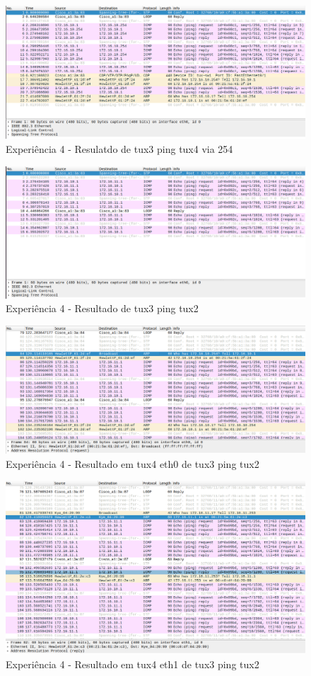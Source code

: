 \begin{figure}[H]
\centering
  \includegraphics[width=\linewidth]{img/EXP4-3to4-254.png}
  \caption{Experiência 4 - Resulatdo de tux3 ping tux4 via 254}
\end{figure}

\begin{figure}[H]
\centering
  \includegraphics[width=\linewidth]{img/EXP4-3to2.png}
  \caption{Experiência 4 - Resultado de tux3 ping tux2}
\end{figure}

\begin{figure}[H]
\centering
  \includegraphics[width=\linewidth]{img/EXP4-task13-eth0.png}
  \caption{Experiência 4 - Resultado em tux4 eth0 de tux3 ping tux2}
\end{figure}

\begin{figure}[H]
\centering
  \includegraphics[width=\linewidth]{img/EXP4-task13-eth1.png}
  \caption{Experiência 4 - Resultado em tux4 eth1 de tux3 ping tux2}
\end{figure}


